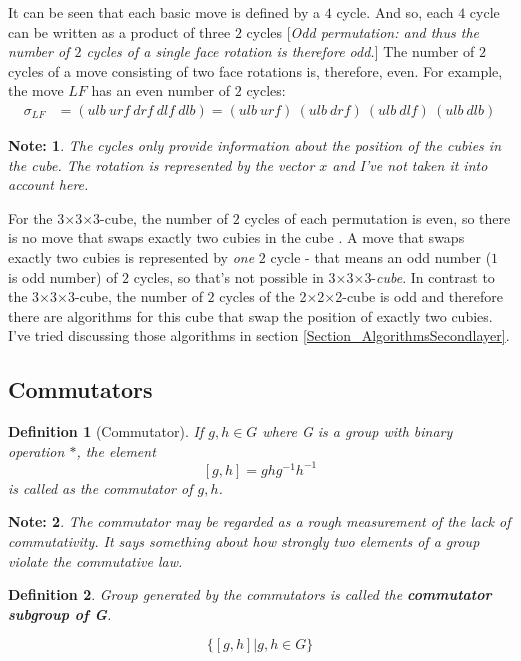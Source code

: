 \documentclass[12pt,a4paper]{article}
\theoremstyle{custom}
\newtheorem*{definition}{Definition}
\newtheorem*{note}{Note:}
\newcommand{\Ttwo}{2$\times$2$\times$2-}
\newcommand{\Tthree}{3$\times$3$\times$3-}
\begin{document}
It can be seen that each basic move is defined by a $4$ cycle. And so, each $4$ cycle can be written as a product of three $2$ cycles [\textit{Odd permutation: and thus the number of $2$ cycles of a single face rotation is therefore odd.}] The number of $2$ cycles of a move consisting of two face rotations is, therefore, even.
For example, the move $LF$ has an even number of $2$ cycles:
\begin{align*}
\sigma_{LF} & = (\textit{ulb} \ \textit{urf} \ \textit{drf} \ \textit{dlf} \ \textit{dlb}) =  (\textit{ulb} \ \textit{urf}) \ (\textit{ulb} \ \textit{drf}) \ (\textit{ulb} \ \textit{dlf}) \ (\textit{ulb} \ \textit{dlb})
\end{align*}
\begin{note}
The cycles only provide information about the position of the cubies in the cube. The rotation is represented by the vector $x$ and I've not taken it into account here.
\end{note}
For the \Tthree cube, the number of $2$ cycles of each permutation is even, so there is no move that swaps exactly two cubies in the cube \cite{TD}. A move that swaps exactly two cubies is represented by \textit{one} $2$ cycle - that means an odd number ($1$ is odd number) of $2$ cycles, so that's not possible in \Tthree \textit{cube}. In contrast to the \Tthree cube, the number of $2$ cycles of the \Ttwo cube is odd and therefore there are algorithms for this cube that swap the position of exactly two cubies. I've tried discussing those algorithms in section \ref{Section_AlgorithmsSecondlayer}.

\subsection{Commutators}
\label{section_commutators8}
 
\begin{definition}[Commutator]
If $g, h \in G$ where G is a group with binary operation $\scriptstyle *$, the element 
$$\boxed{[g,h] =ghg^{-1}h^{-1}}$$ is called as the commutator of $g,h$. 
\end{definition}
 \begin{note}
The commutator may be regarded as a rough measurement of the lack of commutativity. It says something about how strongly two elements of a group violate the commutative law. \cite{wong2010group}
\end{note}
\begin{definition}
    Group generated by the commutators is called the \textbf{commutator subgroup of G}. 

    $$\boxed{\{[g,h]| g, h \in G\}}$$
\end{definition}
\end{document}
